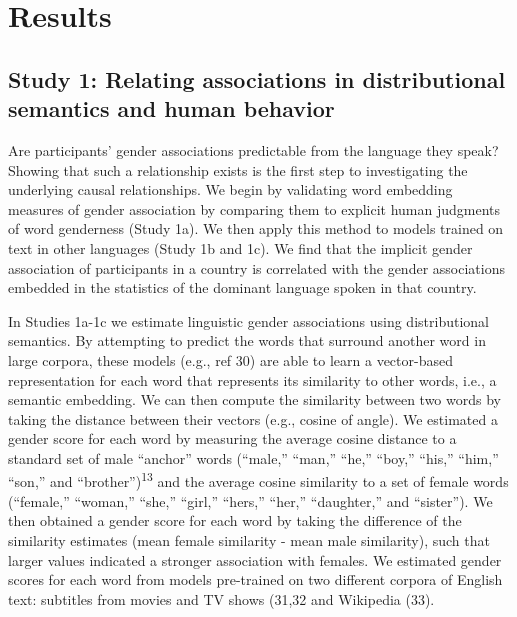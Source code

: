 \documentclass[9pt,twocolumn]{pnas-new}
\begin{document}
\section*{Results}
\subsection*{Study 1: Relating associations in distributional semantics and
human
behavior}\label{study-1-relating-gender-biases-in-distributional-semantics-and-human-behavior}

Are participants' gender associations predictable from the language they
speak? Showing that such a relationship exists is the first step to investigating the underlying causal relationships. We begin by validating word embedding measures of
gender association by comparing them to explicit human judgments of word
genderness (Study 1a). We then apply this method to models trained on
text in other languages (Study 1b and 1c). We find that the implicit gender
association of participants in a country is correlated with the gender associations embedded in the statistics of the dominant language spoken in that country.


In Studies 1a-1c we estimate linguistic gender associations using distributional semantics. By attempting to predict the words that surround another word in large corpora, these models  (e.g., ref 30) are able to learn a vector-based representation for each word that represents its similarity to other words, i.e., a semantic embedding. We can then compute the similarity between two words by taking the distance between their vectors (e.g., cosine of angle). 
We estimated a gender score for each word by measuring the average cosine distance to a standard set of
male \enquote{anchor} words (\enquote{male,} \enquote{man,}
\enquote{he,} \enquote{boy,} \enquote{his,} \enquote{him,}
\enquote{son,} and \enquote{brother})\textsuperscript{13}
and the average cosine similarity to a set of female words
(\enquote{female,} \enquote{woman,} \enquote{she,} \enquote{girl,}
\enquote{hers,} \enquote{her,} \enquote{daughter,} and
\enquote{sister}). We then obtained a gender score for each word by
taking the difference of the similarity estimates (mean female similarity
- mean male similarity), such that larger values indicated a stronger
association with females. We estimated  gender scores for each word from
models pre-trained on two different corpora of English text: subtitles from movies
and TV shows (31,32 and Wikipedia
(33).
\end{document}
